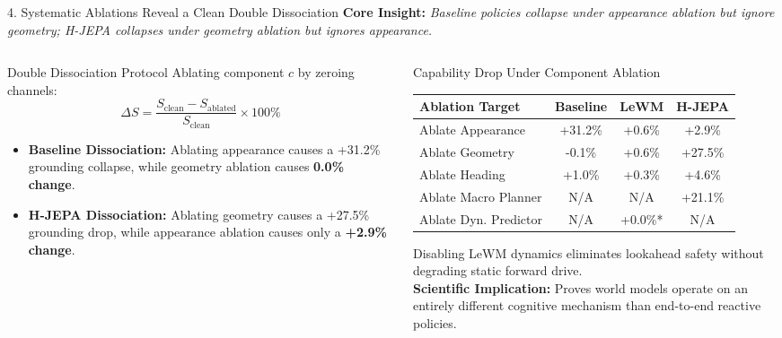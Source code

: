 \documentclass[aspectratio=169, 10pt]{beamer}
\begin{document}
\begin{frame}{4. Systematic Ablations Reveal a Clean Double Dissociation}
  \textbf{Core Insight:} \textit{Baseline policies collapse under appearance ablation but ignore geometry; H-JEPA collapses under geometry ablation but ignores appearance.}

  \vspace{0.2cm}
  \begin{columns}[T]
    \begin{column}{0.48\textwidth}
      \begin{block}{Double Dissociation Protocol}
        \small
        Ablating component $c$ by zeroing channels:
        \begin{equation*}
          \Delta S = \frac{S_{\mathrm{clean}} - S_{\mathrm{ablated}}}{S_{\mathrm{clean}}} \times 100\%
        \end{equation*}
        \begin{itemize}
          \item \textbf{Baseline Dissociation:} Ablating appearance causes a \alert{+31.2\% grounding collapse}, while geometry ablation causes \textbf{0.0\% change}.
          \item \textbf{H-JEPA Dissociation:} Ablating geometry causes a \alert{+27.5\% grounding drop}, while appearance ablation causes only a \textbf{+2.9\% change}.
        \end{itemize}
      \end{block}
    \end{column}

    \begin{column}{0.48\textwidth}
      \begin{block}{Capability Drop Under Component Ablation}
        \scriptsize
        \centering
        \setlength{\tabcolsep}{3pt}
        \begin{tabular}{lccc}
          \toprule
          \textbf{Ablation Target} & \textbf{Baseline} & \textbf{LeWM} & \textbf{H-JEPA} \\
          \midrule
          Ablate Appearance & \alert{+31.2\%} & +0.6\% & +2.9\% \\
          Ablate Geometry & -0.1\% & +0.6\% & \alert{+27.5\%} \\
          Ablate Heading & +1.0\% & +0.3\% & +4.6\% \\
          Ablate Macro Planner & N/A & N/A & \alert{+21.1\%} \\
          Ablate Dyn. Predictor & N/A & +0.0\%* & N/A \\
          \bottomrule
        \end{tabular}
      \end{block}
      \vspace{0.05cm}
      \scriptsize *Disabling LeWM dynamics eliminates lookahead safety without degrading static forward drive.\\
      \textbf{Scientific Implication:} Proves world models operate on an entirely different cognitive mechanism than end-to-end reactive policies.
    \end{column}
  \end{columns}
\end{frame}
\end{document}
